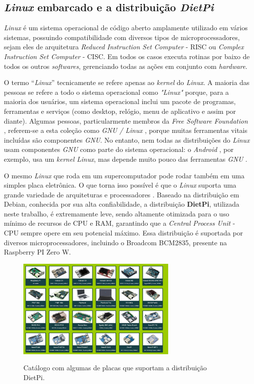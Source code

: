 \subsection{\textit{Linux} embarcado e a distribuição \textit{DietPi}}

\textit{Linux} é um sistema operacional de código aberto amplamente utilizado em vários sistemas, possuindo compatibilidade com diversos tipos de microprocessadores, sejam eles de arquitetura \textit{Reduced Instruction Set Computer} - RISC ou \textit{Complex Instruction Set Computer} - CISC. Em todos os casos executa rotinas por baixo de todos os outros \textit{softwares}, gerenciando todas as ações em conjunto com \textit{hardware}.

O termo “\textit{Linux}” tecnicamente se refere apenas ao \textit{kernel} do \textit{Linux}. A maioria das pessoas se refere a todo o sistema operacional como \textit{"Linux"} porque, para a maioria dos usuários, um sistema operacional inclui um pacote de programas, ferramentas e serviços (como desktop, relógio, menu de aplicativo e assim por diante). Algumas pessoas, particularmente membros da \textit{Free Software Foundation} , referem-se a esta coleção como \textit{GNU / Linux} , porque muitas ferramentas vitais incluídas são componentes \textit{GNU}. No entanto, nem todas as distribuições do \textit{Linux} usam componentes \textit{GNU} como parte do sistema operacional: o \textit{Android} , por exemplo, usa um \textit{kernel Linux}, mas depende muito pouco das ferramentas \textit{GNU} \cite{opensource}.

O mesmo \textit{Linux} que roda em um supercomputador pode rodar também em uma simples placa eletrônica. O que torna isso possível é que o \textit{Linux} suporta uma grande variedade de arquiteturas e processadores \cite{SoftwareLivre}. Baseado na distribuição em Debian, conhecida por sua alta confiabilidade, a distribuição \textbf{DietPi}, utilizada neste trabalho, é extremamente leve, sendo altamente otimizada para o uso mínimo de recursos de CPU e RAM, garantindo que a \textit{Central Process Unit} - CPU sempre opere em seu potencial máximo. Essa distribuição é suportada por diversos microprocessadores, incluindo o Broadcom BCM2835, presente na Raspberry PI Zero W.

\begin{figure}[H]
	\centering
	\caption{Catálogo com algumas de placas que suportam a distribuição DietPi.}
	\includegraphics[width=0.7\textwidth]{figuras/dietpi.jpg}
	\label{fig:dietpi}
\end{figure} 



